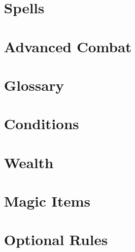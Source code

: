 \documentclass[twocolumn,oneside,letterpaper]{book}
\begin{document}
\chapter{Spells}





\chapter{Advanced Combat}


\normalsize
\setlength\parindent{1em}
\appendix

\chapter{Glossary}\label{Glossary}


\chapter{Conditions}\label{Conditions}


\chapter{Wealth}


\chapter{Magic Items}



\chapter{Optional Rules}

\end{document}
